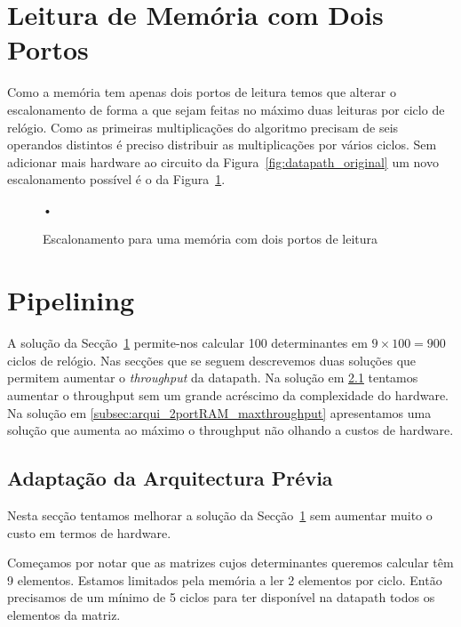 \documentclass[a4paper]{article}
\begin{document}
\section{Leitura de Memória com Dois Portos}
\label{sec:leitura_mem_2portos}

Como a memória tem apenas dois portos de leitura temos que alterar o escalonamento de forma a que sejam feitas no máximo duas leituras por ciclo de relógio. Como as primeiras multiplicações do algoritmo precisam de seis operandos distintos é preciso distribuir as multiplicações por vários ciclos. Sem adicionar mais hardware ao circuito da Figura~\ref{fig:datapath_original} um novo escalonamento possível é o da Figura~\ref{fig:scheduling_2portRAM_basic}.

\begin{figure}[h]
\centering
•
\caption{Escalonamento para uma memória com dois portos de leitura}
\label{fig:scheduling_2portRAM_basic}
\end{figure}

\section{Pipelining}

A solução da Secção~\ref{sec:leitura_mem_2portos} permite-nos calcular 100 determinantes em $ 9 \times 100 = 900 $ ciclos de relógio. Nas secções que se seguem descrevemos duas soluções que permitem aumentar o \textit{throughput} da datapath. Na solução em \ref{subsec:arqui_2portRAM_pipelined_lessHW} tentamos aumentar o throughput sem um grande acréscimo da complexidade do hardware. Na solução em \ref{subsec:arqui_2portRAM_maxthroughput} apresentamos uma solução que aumenta ao máximo o throughput não olhando a custos de hardware.

\subsection{Adaptação da Arquitectura Prévia}
\label{subsec:arqui_2portRAM_pipelined_lessHW}

Nesta secção tentamos melhorar a solução da Secção~\ref{sec:leitura_mem_2portos} sem aumentar muito o custo em termos de hardware.

Começamos por notar que as matrizes cujos determinantes queremos calcular têm 9 elementos. Estamos limitados pela memória a ler 2 elementos por ciclo. Então precisamos de um mínimo de 5 ciclos para ter disponível na datapath todos os elementos da matriz.
\end{document}
